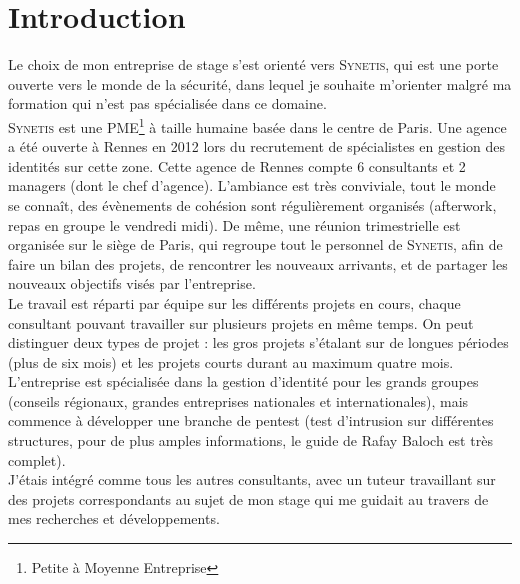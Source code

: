 \section*{Introduction} %
\label{intro}

%
%
%
Le choix de mon entreprise de stage s'est orienté vers \textsc{Synetis}, qui est une porte ouverte vers le monde de la sécurité, dans lequel je souhaite m'orienter malgré ma formation qui n'est pas spécialisée dans ce domaine.\\
\textsc{Synetis} est une PME\footnote{Petite à Moyenne Entreprise} à taille humaine basée dans le centre de Paris. Une agence a été ouverte à Rennes en 2012 lors du recrutement de spécialistes en gestion des identités sur cette zone. Cette agence de Rennes compte 6 consultants et 2 managers (dont le chef d'agence). L'ambiance est très conviviale, tout le monde se connaît, des évènements de cohésion sont régulièrement organisés (afterwork, repas en groupe le vendredi midi). De même, une réunion trimestrielle est organisée sur le siège de Paris, qui regroupe tout le personnel de \textsc{Synetis}, afin de faire un bilan des projets, de rencontrer les nouveaux arrivants, et de partager les nouveaux objectifs visés par l'entreprise.\\
Le travail est réparti par équipe sur les différents projets en cours, chaque consultant pouvant travailler sur plusieurs projets en même temps. On peut distinguer deux types de projet : les gros projets s'étalant sur de longues périodes (plus de six mois) et les projets courts durant au maximum quatre mois. L'entreprise est spécialisée dans la gestion d'identité pour les grands groupes (conseils régionaux, grandes entreprises nationales et internationales), mais commence à développer une branche de pentest (test d'intrusion sur différentes structures, pour de plus amples informations, le guide de Rafay Baloch \cite{rba} est très complet).\\
J'étais intégré comme tous les autres consultants, avec un tuteur travaillant sur des projets correspondants au sujet de mon stage qui me guidait au travers de mes recherches et développements.\\
